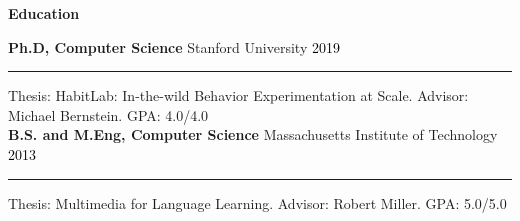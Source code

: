 \documentclass[10pt,A4]{article}
\newcommand{\cvsection}[1]
{
	\begin{center}
		\large\textcolor{sectcol}{\textbf{#1}}
	\end{center}
}
\newcommand{\cvevent}[5]
{

	\textbf{#2} \hspace{1mm} \textcolor{bgcol}{#3} \hfill \vspace{2.5pt}\textcolor{black}{#1}

\vspace{-8pt}
\textcolor{softcol}{\hrule}
\vspace{6pt}

  #4\\[3pt]
  #5\\[6pt]

}
\newcommand{\cvevtone}[4]
{

	\textbf{#2} \hspace{1mm} \textcolor{bgcol}{#3} \hfill \vspace{2.5pt}\textcolor{black}{#1}

\vspace{-8pt}
\textcolor{softcol}{\hrule}
\vspace{6pt}

  #4\\[3pt]

}
\begin{document}



\cvsection{Education}

\cvevtone{2019}{Ph.D, Computer Science}{\textcolor{sectcol}{Stanford University}}{Thesis: HabitLab: In-the-wild Behavior Experimentation at Scale. Advisor: Michael Bernstein. \hfill GPA: 4.0/4.0}%


%
\cvevtone{2013}{B.S. and M.Eng, Computer Science}{\textcolor{sectcol}{Massachusetts Institute of Technology}}{Thesis: Multimedia for Language Learning. Advisor: Robert Miller. \hfill GPA: 5.0/5.0}


%


%


%
%
\end{document}
